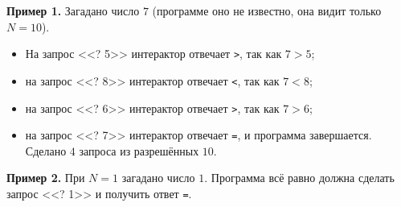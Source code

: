 \textbf{Пример 1.} Загадано число $7$ (программе оно не известно, она видит только $N = 10$).

\begin{itemize}
\item На запрос <<? 5>> интерактор отвечает \texttt{>}, так как $7 > 5$;
\item на запрос <<? 8>> интерактор отвечает \texttt{<}, так как $7 < 8$;
\item на запрос <<? 6>> интерактор отвечает \texttt{>}, так как $7 > 6$;
\item на запрос <<? 7>> интерактор отвечает \texttt{=}, и программа завершается. Сделано $4$ запроса из разрешённых $10$.
\end{itemize}

\textbf{Пример 2.} При $N = 1$ загадано число $1$. Программа всё равно должна сделать запрос <<? 1>> и получить ответ \texttt{=}.
